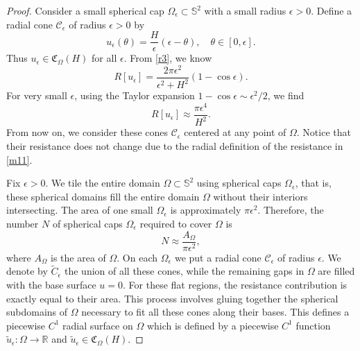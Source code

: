 \documentclass[a4paper,12pt]{amsart}
\theoremstyle{plain}
\theoremstyle{definition}
\def\r{\mathbb R}
\def\s{\mathbb S}
\begin{document}
\begin{proof} 

Consider a small spherical cap $\Omega_\epsilon \subset \s^2$ with a small radius $\epsilon > 0$. Define a radial cone $\mathcal{C}_\epsilon$ of radius $\epsilon>0$ by
\begin{equation*}
 u_\epsilon(\theta) = \frac{H}{\epsilon} \left( \epsilon-\theta \right), \quad \theta \in [0, \epsilon].
\end{equation*}
Thus   $u_\epsilon\in\mathfrak{C}_{\Omega}(H)$ for all $\epsilon$. From \eqref{r3}, we know 
$$R[u_\epsilon]= \frac{2\pi \epsilon^2}{\epsilon^2+H^2}(1-\cos\epsilon). $$
 For very small $\epsilon$, using the Taylor expansion $1 - \cos\epsilon\sim \epsilon^2/2$, we find 
$$
 R[u_\epsilon] \approx \frac{\pi\epsilon^4}{H^2}.
$$
From now on, we consider these cones $\mathcal{C}_\epsilon$ centered at any point of $\Omega$. Notice that their resistance does not change due to the radial definition of the resistance in \eqref{m11}. 



Fix $\epsilon>0$. We tile the entire domain $\Omega \subset \s^2$ using spherical caps $\Omega_\epsilon$, that is, these spherical domains fill the entire domain $\Omega$ without their interiors intersecting. The area of one small $\Omega_\epsilon$ is approximately $ \pi \epsilon^2$. Therefore, the number $N$ of spherical caps $\Omega_\epsilon$ required to cover $\Omega$ is
\begin{equation*}
 N \approx \frac{A_\Omega}{\pi \epsilon^2},
\end{equation*}
where $A_\Omega$ is the area of $\Omega$. On each $\Omega_\epsilon$ we put a radial cone $\mathcal{C}_\epsilon$ of radius $\epsilon$. We denote by $\widetilde{C}_\epsilon$ the union of all these cones, while the remaining gaps in $\Omega$ are filled with the base surface $u=0$. For these flat regions, the resistance contribution is exactly equal to their area. This process involves gluing together the spherical subdomains of $\Omega$ necessary to fit all these cones along their bases. This defines a  piecewise $C^1$  radial surface on $\Omega$ which is defined by a piecewise $C^1$ function $\widetilde{u}_\epsilon\colon\Omega\to\r$ and $\widetilde{u}_\epsilon\in \mathfrak{C}_{\Omega}(H)$.






\end{proof}
\end{document}

